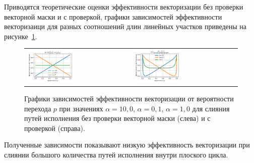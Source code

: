 \documentclass[a4paper,14pt]{extarticle}                     %
\theoremstyle{plain}                                         %
\begin{document}
Приводятся теоретические оценки эффективности векторизации без проверки векторной маски и с проверкой, графики зависимостей эффективности векторизаици для разных соотношений длин линейных участков приведены на рисунке~\ref{fig:text_4_vec_under_cond_chart_e_merged}.

\begin{figure}[ht]
\centering
\begin{tabular}{ll}
	\includegraphics[width=0.45\textwidth]{./pics/text_4_vec_mrg_under_cond/chart_e_merged.png}
	&
	\includegraphics[width=0.45\textwidth]{./pics/text_4_vec_check_mask/chart_e_merged.png}
\end{tabular}
\singlespacing
{}\caption{Графики зависимостей эффективности векторизации от вероятности перехода $p$ при значениях $\alpha = 10,0$, $\alpha = 0,1$, $\alpha = 1,0$ для слияния путей исполнения без проверки векторной маски (слева) и с проверкой (справа).}
\label{fig:text_4_vec_under_cond_chart_e_merged}
\end{figure}

Полученные зависимости показывают низкую эффективность векторизации при слиянии большого количества путей исполнения внутри плоского цикла.
\end{document}
